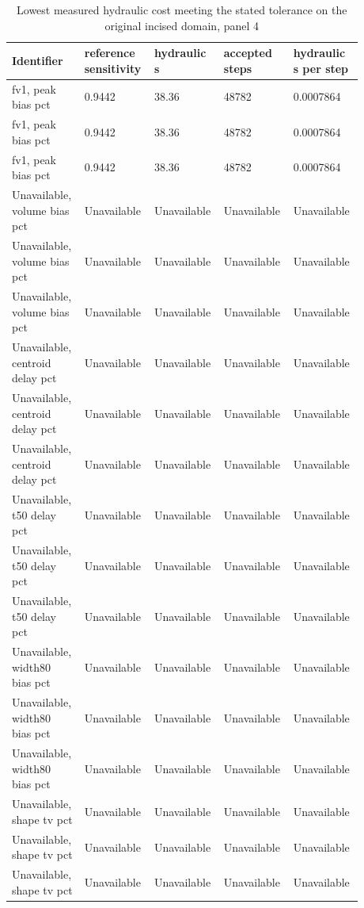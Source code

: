 \begin{longtable}{p{0.1760\linewidth}p{0.1760\linewidth}p{0.1760\linewidth}p{0.1760\linewidth}p{0.1760\linewidth}}
\caption{Lowest measured hydraulic cost meeting the stated tolerance on the original incised domain, panel 4}\\
\hline
Identifier & reference sensitivity & hydraulic s & accepted steps & hydraulic s per step \\
\hline\endhead
fv1, peak bias pct & 0.9442 & 38.36 & 48782 & 0.0007864 \\
fv1, peak bias pct & 0.9442 & 38.36 & 48782 & 0.0007864 \\
fv1, peak bias pct & 0.9442 & 38.36 & 48782 & 0.0007864 \\
Unavailable, volume bias pct & Unavailable & Unavailable & Unavailable & Unavailable \\
Unavailable, volume bias pct & Unavailable & Unavailable & Unavailable & Unavailable \\
Unavailable, volume bias pct & Unavailable & Unavailable & Unavailable & Unavailable \\
Unavailable, centroid delay pct & Unavailable & Unavailable & Unavailable & Unavailable \\
Unavailable, centroid delay pct & Unavailable & Unavailable & Unavailable & Unavailable \\
Unavailable, centroid delay pct & Unavailable & Unavailable & Unavailable & Unavailable \\
Unavailable, t50 delay pct & Unavailable & Unavailable & Unavailable & Unavailable \\
Unavailable, t50 delay pct & Unavailable & Unavailable & Unavailable & Unavailable \\
Unavailable, t50 delay pct & Unavailable & Unavailable & Unavailable & Unavailable \\
Unavailable, width80 bias pct & Unavailable & Unavailable & Unavailable & Unavailable \\
Unavailable, width80 bias pct & Unavailable & Unavailable & Unavailable & Unavailable \\
Unavailable, width80 bias pct & Unavailable & Unavailable & Unavailable & Unavailable \\
Unavailable, shape tv pct & Unavailable & Unavailable & Unavailable & Unavailable \\
Unavailable, shape tv pct & Unavailable & Unavailable & Unavailable & Unavailable \\
Unavailable, shape tv pct & Unavailable & Unavailable & Unavailable & Unavailable \\

\end{longtable}
